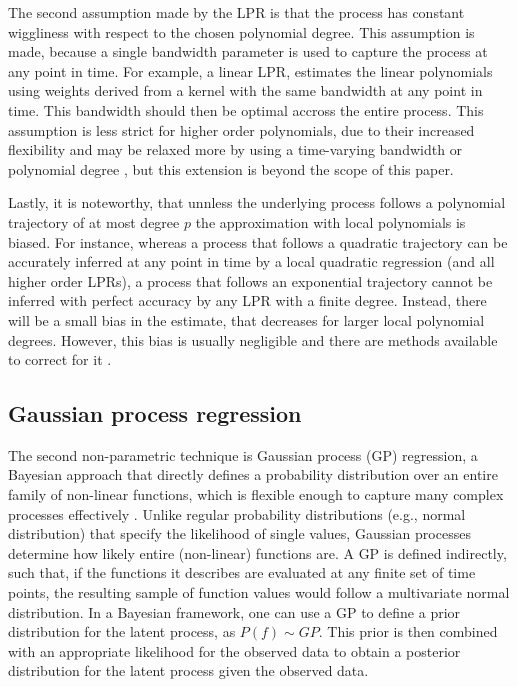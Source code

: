 \documentclass[man, floatsintext]{apa7}
\begin{document}
The second assumption made by the LPR is that the process has constant
wiggliness with respect to the chosen polynomial degree. This assumption is
made, because a single bandwidth parameter is used to capture the process at
any point in time. For example, a linear LPR, estimates the linear polynomials
using weights derived from a kernel with the same bandwidth at any point in
time. This bandwidth should then be optimal accross the entire process. This
assumption is less strict for higher order polynomials, due to their increased
flexibility and may be relaxed more by using a time-varying
bandwidth \parencite{fan_data-driven_1995} or polynomial degree
\parencite{fan_adaptive_1995}, but this extension is beyond the scope of this
paper.

Lastly, it is noteworthy, that unnless the underlying process follows a
polynomial trajectory of at most degree $p$ the approximation with local
polynomials is biased. For instance, whereas a process that follows a
quadratic trajectory can be accurately inferred at any point in time
by a local quadratic regression (and all higher order LPRs), a process that
follows an exponential trajectory cannot be inferred with perfect accuracy
by any LPR with a finite degree. Instead, there will be a small bias in the
estimate, that decreases for larger local polynomial degrees.
However, this bias is usually negligible and there are methods available to
correct for it \parencite{R-nprobust}.

\subsection{Gaussian process regression}

The second non-parametric technique is Gaussian process (GP) regression, a
Bayesian approach that directly defines a probability distribution over an
entire family of non-linear functions, which is flexible enough to capture many
complex processes effectively \parencite{rasmussen_gaussian_2006,
  betancourt_robust_2020, roberts_gaussian_2013}. Unlike regular probability
distributions (e.g., normal distribution) that specify the likelihood of
single values, Gaussian processes determine how likely entire
(non-linear) functions are. A GP is defined indirectly, such that, if the
functions it describes are evaluated at any finite set of time points, the
resulting sample of function values would follow a multivariate normal
distribution. In a Bayesian framework, one can use a GP to define a prior
distribution for the latent process, as $P(f) \sim GP$. This prior is then
combined with an appropriate likelihood for the observed data to obtain a
posterior distribution for the latent process given the observed data.
\end{document}
